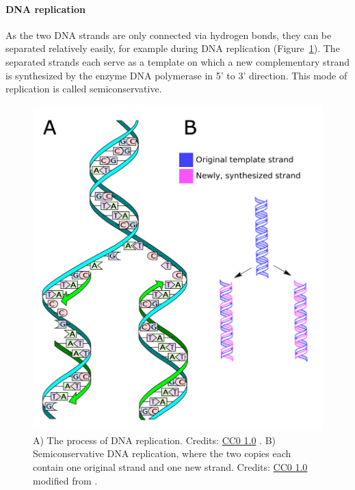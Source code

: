 \paragraph{DNA replication}\label{chapter1_replication}

As the two DNA strands are only connected via hydrogen bonds, they can be separated relatively easily, for example during DNA replication (Figure~\ref{replication_alt}).
The separated strands each serve as a template on which a new complementary strand is synthesized by the enzyme DNA polymerase in 5' to 3' direction.
This mode of replication is called semiconservative.

% 

\begin{figure}[!htbp]
\centering
\includegraphics[width=0.5\linewidth]{files/replication_alt-f04199f765869f1200a2c0d77cd5136c.png}
\caption[]{A) The process of DNA replication.
Credits: \href{https://creativecommons.org/publicdomain/zero/1.0/}{CC0 1.0} \cite{replication_a_2013}.
B) Semiconservative DNA replication, where the two copies each contain one original strand and one new strand.
Credits: \href{https://creativecommons.org/publicdomain/zero/1.0/}{CC0 1.0} modified from \cite{replication_b_alt_2009}.}
\label{replication_alt}
\end{figure}

